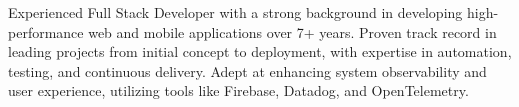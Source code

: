 

\begin{cvparagraph}

Experienced Full Stack Developer with a strong background in developing high-performance web and mobile applications over 7+ years. Proven track record in leading projects from initial concept to deployment, with expertise in automation, testing, and continuous delivery. Adept at enhancing system observability and user experience, utilizing tools like Firebase, Datadog, and OpenTelemetry.
\end{cvparagraph}
